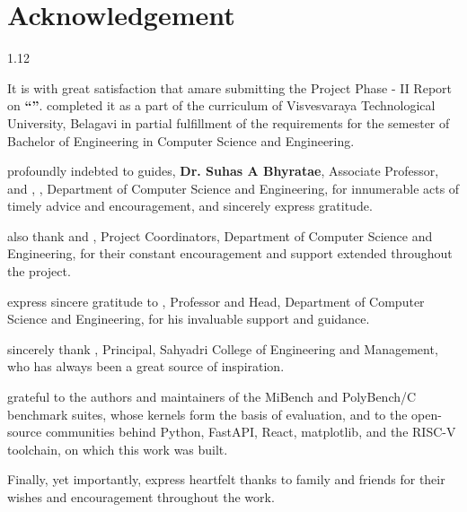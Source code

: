 \chapter*{Acknowledgement}
\begin{spacing}{1.12}

It is with great satisfaction that \weLow{} \ifdefined\Individual am\else are\fi{} submitting the Project Phase - II Report on \textbf{``\ProjectTitle''}. \WeHave{} completed it as a part of the curriculum of Visvesvaraya Technological University, Belagavi in partial fulfillment of the requirements for the \Semester{} semester of Bachelor of Engineering in Computer Science and Engineering.

\WeAre{} profoundly indebted to \ourLow{} guides, \textbf{Dr. Suhas A Bhyratae}, Associate Professor, and \textbf{\GuideName}, \GuideDesignation, Department of Computer Science and Engineering, for innumerable acts of timely advice and encouragement, and \weLow{} sincerely express \ourLow{} gratitude.

\WeCap{} also thank \textbf{\CoordinatorTwo} and \textbf{\CoordinatorName}, Project Coordinators, Department of Computer Science and Engineering, for their constant encouragement and support extended throughout the project.

\WeCap{} express \ourLow{} sincere gratitude to \textbf{\HodName}, Professor and Head, Department of Computer Science and Engineering, for his invaluable support and guidance.

\WeCap{} sincerely thank \textbf{\PrincipalName}, Principal, Sahyadri College of Engineering and Management, who has always been a great source of inspiration.

\WeAre{} grateful to the authors and maintainers of the MiBench and PolyBench/C benchmark suites, whose kernels form the basis of \ourLow{} evaluation, and to the open-source communities behind Python, FastAPI, React, matplotlib, and the RISC-V toolchain, on which this work was built.

Finally, yet importantly, \weLow{} express \ourLow{} heartfelt thanks to \ourLow{} family and friends for their wishes and encouragement throughout the work.

\vspace{0.3em}
\begin{flushright}
\StudentRightList
\end{flushright}
\end{spacing}
